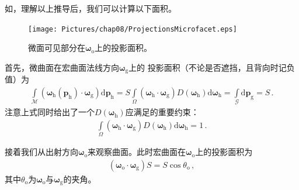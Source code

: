 如，理解以上推导后，我们可以计算以下面积。
\begin{figure}[htbp]
    \centering
    \texttt{[image: Pictures/chap08/ProjectionsMicrofacet.eps]}
    \caption{微面可见部分在${\bm\omega}_{\mathrm{o}}$上的投影面积。}
    \label{fig:08ex01-ProjectionsMicrofacetArea}
\end{figure}

首先，微曲面在宏曲面法线方向${\bm\omega}_{\mathrm{g}}$上的
投影面积（不论是否遮挡，且背向时记负值）为
\begin{align}
    \int\limits_{\mathcal{M}}({\bm\omega}_{\mathrm{h}}({\bm p}_{\mathrm{h}})
    \cdot{\bm\omega}_{\mathrm{g}})\mathrm{d}{\bm p}_{\mathrm{h}}
    =S\int\limits_{\varOmega}({\bm\omega}_{\mathrm{h}}\cdot{\bm\omega}_{\mathrm{g}})
    D({\bm\omega}_{\mathrm{h}})\mathrm{d}{\bm\omega}_{\mathrm{h}}
    =\int\limits_{\mathcal{G}}\mathrm{d}{\bm p}_{\mathrm{g}}=S\, .
\end{align}
注意上式同时给出了一个$D({\bm\omega}_{\mathrm{h}})$应满足的重要约束：
\begin{align}\label{eq:08ex01-McrofacetDistributionNormalization}
    \int\limits_{\varOmega}({\bm\omega}_{\mathrm{h}}\cdot{\bm\omega}_{\mathrm{g}})
    D({\bm\omega}_{\mathrm{h}})\mathrm{d}{\bm\omega}_{\mathrm{h}}=1\, .
\end{align}

接着我们从出射方向${\bm\omega}_{\mathrm{o}}$来观察曲面。此时宏曲面在${\bm\omega}_{\mathrm{o}}$上的投影面积为
\begin{align}
    \label{eq:08ex01-AreaMacrosurface}
    ({\bm\omega}_{\mathrm{o}}\cdot{\bm\omega}_{\mathrm{g}})S=S\cos\theta_{\mathrm{o}}\, ,
\end{align}
其中$\theta_{\mathrm{o}}$为${\bm\omega}_{\mathrm{o}}$与${\bm\omega}_{\mathrm{g}}$的夹角。

